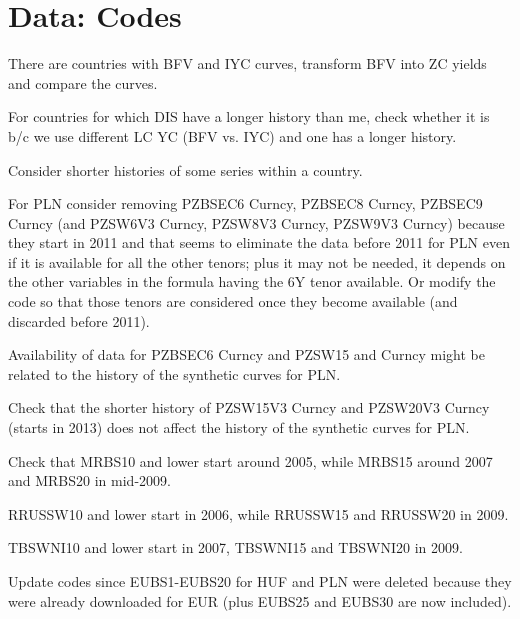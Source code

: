 \documentclass[12pt]{article}
\newcommand{\cmark}{\ding{51}}
\newcommand{\done}{\rlap{$\square$}{\raisebox{2pt}{\large\hspace{1pt}\cmark}}%
	\hspace{-2.5pt}}
\begin{document}
\section{Data: Codes}
\begin{todolist}
	\item There are countries with BFV and IYC curves, transform BFV into ZC yields and compare the curves.
	\item For countries for which DIS have a longer history than me, check whether it is b/c we use different LC YC (BFV vs. IYC) and one has a longer history.
	\item Consider shorter histories of some series within a country.
	\begin{todolist}
		\item For PLN consider removing PZBSEC6 Curncy, PZBSEC8 Curncy, PZBSEC9 Curncy (and PZSW6V3 Curncy, PZSW8V3 Curncy, PZSW9V3 Curncy) because they start in 2011 and that seems to eliminate the data before 2011 for PLN even if it is available for all the other tenors; plus it may not be needed, it depends on the other variables in the formula having the 6Y tenor available. Or modify the code so that those tenors are considered once they become available (and discarded before 2011).
		\item Availability of data for PZBSEC6 Curncy and PZSW15 and Curncy might be related to the history of the synthetic curves for PLN.
		\item Check that the shorter history of PZSW15V3 Curncy and PZSW20V3 Curncy (starts in 2013) does not affect the history of the synthetic curves for PLN.
		\item Check that MRBS10 and lower start around 2005, while MRBS15 around 2007 and MRBS20 in mid-2009.
		\item RRUSSW10 and lower start in 2006, while RRUSSW15 and RRUSSW20 in 2009.
		\item TBSWNI10  and lower start in 2007, TBSWNI15 and TBSWNI20 in 2009.
	\end{todolist}
	\item[\done] Update codes since EUBS1-EUBS20 for HUF and PLN were deleted because they were already downloaded for EUR (plus EUBS25 and EUBS30 are now included).
\end{todolist}
\end{document}

